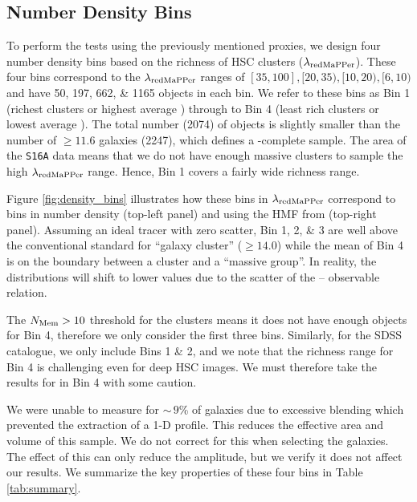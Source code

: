 \documentclass[fleqn,usenatbib,useAMS]{mnras}
\begin{document}
\subsection{Number Density Bins}
    \label{sec:binning}

    To perform the \topn{} tests using the previously mentioned proxies, we design four number
    density bins based on the richness of HSC \redm{} clusters ($\lambda_{\rm redMaPPer}$).
    These four bins correspond to the $\lambda_{\rm redMaPPer}$ ranges of $[35, 100], [20, 35),
    [10, 20), [6, 10)$ and have 50, 197, 662, \& 1165 objects in each bin.
    We refer to these bins as Bin 1 (richest clusters or highest average \mvir{}) through to Bin 4
    (least rich clusters or lowest average \mvir{}).
    The total number (2074) of objects is slightly smaller than the number of $\geq
    11.6$ galaxies (2247), which defines a \mstar{}-complete sample. 
    The area of the \texttt{S16A} data means that we do not have enough massive clusters to sample
    the high $\lambda_{\rm redMaPPer}$ range. 
    Hence, Bin 1 covers a fairly wide richness range.

    Figure \ref{fig:density_bins} illustrates how these bins in $\lambda_{\rm redMaPPer}$ correspond
    to bins in number density (top-left panel) and \mvir{} using the HMF from  (top-right
    panel). 
    Assuming an ideal tracer with zero scatter, Bin 1, 2, \& 3 are well above the conventional
    standard for ``galaxy cluster'' (\logmvir{}$\geq 14.0$) while the mean \mvir{} of Bin 4 is on
    the boundary between a cluster and a ``massive group''. 
    In reality, the \mvir{} distributions will shift to lower values due to the scatter of the 
    \mvir{} -- observable relation.

    The $N_{\rm Mem} > 10$ threshold for the \camira{} clusters means it does not have enough
    objects for Bin 4, therefore we only consider the first three bins.
    Similarly, for the SDSS \redm{} catalogue, we only include Bins 1 \& 2, and we note that the
    richness range for Bin 4 is challenging even for deep HSC images.
    We must therefore take the results for \redm{} in Bin 4 with some caution.

    We were unable to measure \mstar{} for $\sim\,9$\% of galaxies due to excessive blending which
    prevented the extraction of a 1-D profile. 
    This reduces the effective area and volume of this sample.
    We do not correct for this when selecting the \topn{} galaxies. 
    The effect of this can only reduce the \dsigma{} amplitude, but we verify it does not affect our
    results.
    We summarize the key properties of these four bins in Table \ref{tab:summary}.
\end{document}
